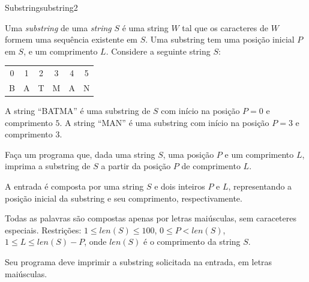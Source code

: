 \documentclass[12pt,a4paper,oneside]{article}
\begin{document}
\begin{problem}{Substring}{substring}{2}
 
Uma \textit{substring} de uma \textit{string} $S$ é uma string $W$ tal que os caracteres de $W$ formem uma sequência existente em $S$. Uma substring tem uma posição inicial $P$ em $S$, e um comprimento $L$. Considere a seguinte string $S$:

\begin{center}
\begin{tabular}{|c|c|c|c|c|c|}
\hline
     0 & 1 & 2 & 3 & 4 & 5 \\
     B & A & T & M & A & N \\
\hline
\end{tabular}
\end{center}

A string ``BATMA'' é uma substring de $S$ com início na posição $P=0$ e comprimento $5$. A string ``MAN'' é uma substring com início na posição $P=3$ e comprimento $3$.

Faça um programa que, dada uma string $S$, uma posição $P$ e um comprimento $L$, imprima a substring de $S$ a partir da posição $P$ de comprimento $L$.

%

\InputFile

A entrada é composta por uma string $S$ e dois inteiros $P$ e $L$, representando a posição inicial da substring e seu comprimento, respectivamente.

Todas as palavras são compostas apenas por letras maiúsculas, sem caraceteres especiais. Restrições: $1 \leq len(S) \leq 100$, $0 \leq P < len(S)$, $1 \leq L \leq len(S) - P$, onde $len(S)$ é o comprimento da string $S$.

\OutputFile

Seu programa deve imprimir a substring solicitada na entrada, em letras maiúsculas.


\Example

\begin{example}
%
\end{example}

\begin{example}
%
\end{example}

\begin{example}
%
\end{example}

\begin{example}
%
\end{example}


\end{problem}
\end{document}
